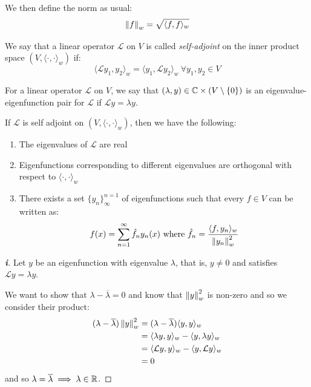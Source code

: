 \documentclass[../main.tex]{subfiles}
\begin{document}
We then define the norm as usual:
\[
  \left\lVert f \right\rVert_{w} = \sqrt{\langle f, f \rangle_{w}}
\]
\begin{definition}
  We say that a linear operator $\mathcal{L}$ on $V$ is called \textit{self-adjoint} on the inner product space $(V, \langle \cdot, \cdot \rangle_{w})$ if:
  \[
    \langle \mathcal{L}y_1, y_2 \rangle_{w} = \langle y_1, \mathcal{L}y_2 \rangle_{w}\ \forall y_1, y_2 \in V
  \]
\end{definition}
\begin{definition}
  For a linear operator $\mathcal{L}$ on $V$, we say that $(\lambda, y) \in \mathbb{C} \times (V \setminus \{0\})$ is an eigenvalue-eigenfunction pair for $\mathcal{L}$ if $\mathcal{L} y = \lambda y$.
\end{definition}
\begin{proposition}
  If $\mathcal{L}$ is self adjoint on $(V, \langle \cdot, \cdot \rangle_{w})$, then we have the following: \label{selfAdjProp}
  \begin{enumerate}
    \item The eigenvalues of $\mathcal{L}$ are real
    \item Eigenfunctions corresponding to different eigenvalues are orthogonal with respect to $\langle \cdot, \cdot \rangle_{w}$
    \item There exists a set $\{y_n\}^{n = 1}_{\infty}$ of eigenfunctions such that every $f \in V$ can be written as:
      \[
        f(x) = \sum_{n = 1}^{\infty} \hat{f}_n y_n(x) \text{ where } \hat{f}_n = \frac{\langle f, y_n \rangle_{w}}{\left\lVert y_n \right\rVert^2_w}
      \]
  \end{enumerate}
\end{proposition}
\begin{proof}[\textbf{i}]
  Let $y$ be an eigenfunction with eigenvalue $\lambda$, that is, $y \neq 0$ and satisfies $\mathcal{L}y = \lambda y$.

  We want to show that $\lambda - \overline{\lambda} = 0$ and know that $\left\lVert y \right\rVert^2_{w}$ is non-zero and so we consider their product:
  \begin{align*}
    (\lambda - \overline{\lambda})\left\lVert y \right\rVert^2_w &= (\lambda - \overline{\lambda})\langle y, y \rangle_{w} \\
                                               &= \langle \lambda y, y \rangle_{w} - \langle y, \lambda y \rangle_{w} \\
                                               &= \langle \mathcal{L}y, y \rangle_{w} - \langle y, \mathcal{L}y \rangle_{w} \\
                                               &= 0
  \end{align*}
  and so $\lambda = \overline{\lambda} \implies \lambda \in \mathbb{R}$.
\end{proof}
\end{document}
